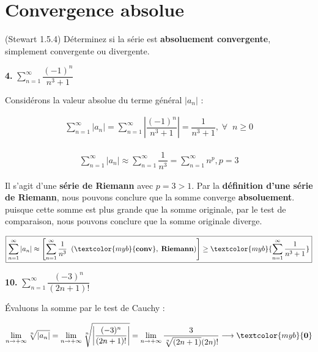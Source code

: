 \documentclass{report}
\begin{document}
    \section{Convergence absolue}

    \begin{Exercice}{(Stewart 1.5.4)}{}
       Déterminez si la série est \textbf{absoluement convergente}, 
       simplement convergente ou divergente. 
    \end{Exercice}

    \vspace{1em} 
    \noindent %
    \textbf{4.} $\sum_{n=1}^{\infty }\dfrac{(-1)^n}{n^3 + 1}$ 

    Considérons la valeur absolue du terme général $|a_n|$ :

    \begin{align*}
        \sum_{n=1}^{\infty }|a_n| = 
        \sum_{n=1}^{\infty }\left|\dfrac{(-1)^n}{n^3 +1}\right|
        = 
        \dfrac{1}{n^3 + 1}, \; \forall \;\; n \geq 0 
    \end{align*}


    \begin{align*}
        \sum_{n=1}^{\infty }| a_n | \approx 
        \sum_{n=1}^{\infty }\dfrac{1}{n^3} =
        \sum_{n=1}^{\infty }n^p, p = 3
    \end{align*}

    Il s'agit d'une \textbf{série de Riemann} avec $p = 3 > 1$. 
    Par la \textbf{définition d'une série de Riemann}, nous pouvons 
    conclure que la somme converge \textbf{absoluement}. puisque cette 
    somme est plus grande que la somme originale, par le test 
    de comparaison, nous pouvons conclure que la somme originale 
    diverge. 

    \begin{align*}
        \boxed{
        \sum_{n=1}^{\infty }|a_n| \approx 
        \left[
        \sum_{n=1}^{\infty } \dfrac{1}{n^3} \;\;
        (\textcolor{myb}{\textbf{conv}}, \; \textbf{Riemann}) 
        \right]
        \geq 
        \textcolor{myb}{
            \sum_{n=1}^{\infty } \dfrac{1}{n^3 + 1}
        }  
    }
    \end{align*}            


    \vspace{1em}
    \noindent %
    \textbf{10.} $\sum_{n=1}^{\infty }\dfrac{(-3)^n}{(2n + 1)!}$ 

    Évaluons la somme par le test de Cauchy :

    \begin{align*}
        \lim\limits_{n \to+\infty }\sqrt[n]{|a_n|} =  
        \lim\limits_{n \to+\infty } 
        \sqrt[n]{\left|\dfrac{(-3)^n}{(2n + 1)!}\right|} 
        = 
        \lim\limits_{n \to+\infty } 
        \frac{3}{\sqrt[n]{(2n+1)}(2n)!} 
        \longrightarrow \textcolor{myb}{\textbf{0}} 
    \end{align*} 
\end{document}
